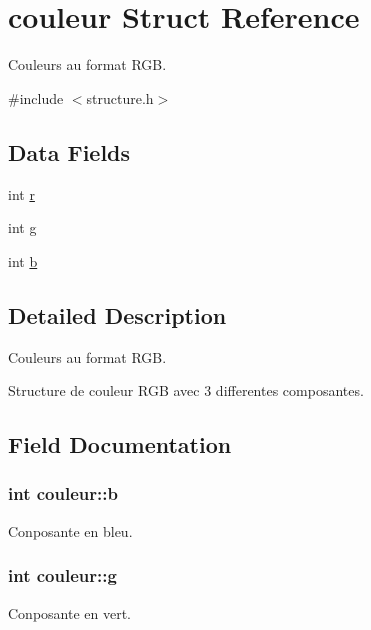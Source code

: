 \hypertarget{structcouleur}{}\section{couleur Struct Reference}
\label{structcouleur}


Couleurs au format R\+GB.  




{\ttfamily \#include $<$structure.\+h$>$}

\subsection*{Data Fields}
\begin{DoxyCompactItemize}
\item 
int \hyperlink{structcouleur_a88aa7196c44cbb8320595a141274af9d}{r}
\item 
int \hyperlink{structcouleur_af30f7e386901da59fdb99a71667a00b6}{g}
\item 
int \hyperlink{structcouleur_aa96505e3a05d727d5372b29d9cadfb28}{b}
\end{DoxyCompactItemize}


\subsection{Detailed Description}
Couleurs au format R\+GB. 

Structure de couleur R\+GB avec 3 differentes composantes. 

\subsection{Field Documentation}
\subsubsection[{\texorpdfstring{b}{b}}]{\setlength{\rightskip}{0pt plus 5cm}int couleur\+::b}\hypertarget{structcouleur_aa96505e3a05d727d5372b29d9cadfb28}{}\label{structcouleur_aa96505e3a05d727d5372b29d9cadfb28}
Conposante en bleu. 
\subsubsection[{\texorpdfstring{g}{g}}]{\setlength{\rightskip}{0pt plus 5cm}int couleur\+::g}\hypertarget{structcouleur_af30f7e386901da59fdb99a71667a00b6}{}\label{structcouleur_af30f7e386901da59fdb99a71667a00b6}
Conposante en vert. 
